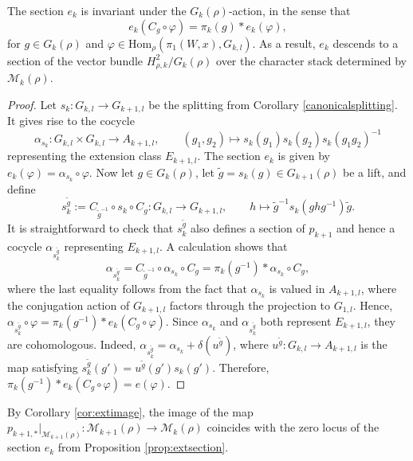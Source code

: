 \documentclass[10pt]{amsart}
\numberwithin{theoremalpha}{section}
\numberwithin{equation}{section}
\numberwithin{definition}{section}
\numberwithin{theorem}{section}
\numberwithin{proposition}{section}
\numberwithin{lemma}{section}
\numberwithin{example}{section}
\numberwithin{remark}{section}
\numberwithin{corollary}{section}
\numberwithin{question}{section}
\numberwithin{problem}{section}
\numberwithin{assumption}{section}
\theoremstyle{named}
\numberwithin{equation}{section}
\begin{document}
\begin{proposition} \label{prop:extsection}
The section $e_{k}$ is invariant under the $G_{k}(\rho)$-action, in the sense that  
\[
e_{k}(C_{g} \circ \varphi) = \pi_k(g) \ast e_{k}(\varphi),
\]
for $g \in G_{k}(\rho)$ and $\varphi \in \mathrm{Hom}_{\rho}(\pi_{1}(W,x), G_{k,l})$. As a result, $e_{k}$ descends to a section of the vector bundle $H^2_{\rho, k}/G_{k}(\rho)$ over the character stack determined by $\mathcal{M}_{k}(\rho)$. 
\end{proposition}
\begin{proof}
Let $s_{k} : G_{k,l} \to G_{k+1, l}$ be the splitting from Corollary \ref{canonicalsplitting}. It gives rise to the cocycle
\[
\alpha_{s_{k}} : G_{k,l} \times G_{k,l} \to A_{k+1,l}, \qquad (g_1, g_2) \mapsto s_{k}(g_1)s_{k}(g_2) s_{k}(g_1 g_2)^{-1}
\]
representing the extension class $E_{k+1, l}$. The section $e_k$ is given by $e_k(\varphi) = \alpha_{s_{k}} \circ \varphi$. Now let $g \in G_{k}(\rho)$, let $\tilde{g} = s_{k}(g) \in G_{k+1}(\rho)$ be a lift, and define 
\[
s_{k}^{\tilde{g}} := C_{\tilde{g}^{-1}} \circ s_{k} \circ C_{g} : G_{k,l} \to G_{k+1, l}, \qquad h \mapsto \tilde{g}^{-1}s_{k}(g h g^{-1}) \tilde{g}. 
\]
It is straightforward to check that $s_{k}^{\tilde{g}}$ also defines a section of $p_{k+1}$ and hence a cocycle $\alpha_{s^{\tilde{g}}_{k}}$ representing $E_{k+1,l}$.  A calculation shows that 
\[
\alpha_{s^{\tilde{g}}_{k}} = C_{\tilde{g}^{-1}} \circ \alpha_{s_{k}}  \circ C_{g} = \pi_{k}(g^{-1}) \ast \alpha_{s_{k}}  \circ C_{g},
\]
where the last equality follows from the fact that $\alpha_{s_{k}}$ is valued in $A_{k+1,l}$, where the conjugation action of $G_{k+1, l}$ factors through the projection to $G_{1,l}$. Hence, $\alpha_{s^{\tilde{g}}_{k}} \circ \varphi = \pi_{k}(g^{-1}) \ast e_k(C_{g} \circ \varphi)$. Since $\alpha_{s_{k}}$ and $\alpha_{s^{\tilde{g}}_{k}} $ both represent $E_{k+1,l}$, they are cohomologous. Indeed, $\alpha_{s^{\tilde{g}}_{k}} = \alpha_{s_{k}} + \delta(u^{\tilde{g}})$, where $u^{\tilde{g}} : G_{k,l} \to A_{k+1,l}$ is the map satisfying $s_{k}^{\tilde{g}}(g') = u^{\tilde{g}}(g')s_{k}(g')$. Therefore, $\pi_{k}(g^{-1}) \ast e_k(C_{g} \circ \varphi) = e(\varphi)$.
\end{proof}
\begin{remark}
By Corollary \ref{cor:extimage}, the image of the map $p_{k+1, *}|_{\mathcal{M}_{k+1}(\rho)} : \mathcal{M}_{k+1}(\rho) \to \mathcal{M}_{k}(\rho)$ coincides with the zero locus of the section $e_k$ from Proposition \ref{prop:extsection}. 
\end{remark}
\end{document}

